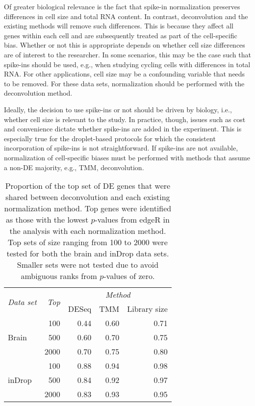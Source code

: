 \documentclass{article}
\begin{document}
Of greater biological relevance is the fact that spike-in normalization preserves differences in cell size and total RNA content.
In contrast, deconvolution and the existing methods will remove such differences.
This is because they affect all genes within each cell and are subsequently treated as part of the cell-specific bias.
Whether or not this is appropriate depends on whether cell size differences are of interest to the researcher.
In some scenarios, this may be the case such that spike-ins should be used, e.g., when studying cycling cells with differences in total RNA.
For other applications, cell size may be a confounding variable that needs to be removed.
For these data sets, normalization should be performed with the deconvolution method.

Ideally, the decision to use spike-ins or not should be driven by biology, i.e., whether cell size is relevant to the study.
In practice, though, issues such as cost and convenience dictate whether spike-ins are added in the experiment.
This is especially true for the droplet-based protocols \cite{macosko2015highly,klein2015droplet} for which the consistent incorporation of spike-ins is not straightforward.
If spike-ins are not available, normalization of cell-specific biases must be performed with methods that assume a non-DE majority, e.g., TMM, deconvolution.

\begin{table}[p]
    \caption{
        Proportion of the top set of DE genes that were shared between deconvolution and each existing normalization method.
        Top genes were identified as those with the lowest $p$-values from edgeR in the analysis with each normalization method.
        Top sets of size ranging from 100 to 2000 were tested for both the brain and inDrop data sets.
        Smaller sets were not tested due to avoid ambiguous ranks from $p$-values of zero.
    }
    \begin{center}
        \begin{tabular}{l r r r r}
            \hline
            \multirow{2}{*}{\textit{Data set}} & \multirow{2}{*}{\textit{Top}} & \multicolumn{3}{c}{\textit{Method}} \\
                \cline{3-5}
                & & DESeq & TMM & Library size \\
            \hline
            \multirow{3}{*}{Brain}            
            & 100  & 0.44 & 0.60 & 0.71 \\ 
            & 500  & 0.60 & 0.70 & 0.75 \\
            & 2000 & 0.70 & 0.75 & 0.80 \\
            \hline
            \multirow{3}{*}{inDrop}            
            & 100  & 0.88 & 0.94 & 0.98 \\ 
            & 500  & 0.84 & 0.92 & 0.97 \\
            & 2000 & 0.83 & 0.93 & 0.95 \\
            \hline
        \end{tabular}
    \end{center}
\end{table}
\end{document}
